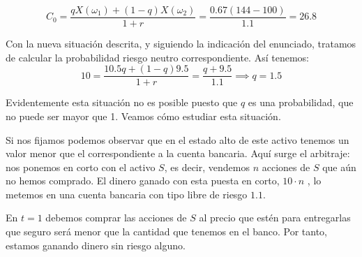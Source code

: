 \begin{problem}[2]
\[C_0 = \frac{qX(ω_1) + (1-q)X(ω_2)}{1+r} = \frac{0.67(144-100)}{1.1} = 26.8\]

\spart

Con la nueva situación descrita, y siguiendo la indicación del enunciado, tratamos de calcular la probabilidad riesgo neutro correspondiente. Así tenemos:
\[10 = \frac{10.5q + (1-q)9.5}{1+r} = \frac{q+9.5}{1.1}\implies q=1.5 \]

Evidentemente esta situación no es posible puesto que $q$ es una probabilidad, que no puede ser mayor que 1. Veamos cómo estudiar esta situación.

Si nos fijamos podemos observar que en el estado alto de este activo tenemos un valor menor que el correspondiente a la cuenta bancaria. Aquí surge el arbitraje: nos ponemos en corto con el activo $S$, es decir, vendemos $n$ acciones de $S$ que aún no hemos comprado. El dinero ganado con esta puesta en corto, $10\cdot n$ \texteuro, lo metemos en una cuenta bancaria con tipo libre de riesgo $1.1$.

En $t=1$ debemos comprar las acciones de $S$ al precio que estén para entregarlas que seguro será menor que la cantidad que tenemos en el banco. Por tanto, estamos ganando dinero sin riesgo alguno.
\end{problem}

